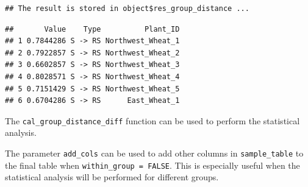 \documentclass[
]{book}
\newenvironment{Shaded}{\begin{snugshade}}{\end{snugshade}}
\newcommand{\AttributeTok}[1]{\textcolor[rgb]{0.13,0.29,0.53}{#1}}
\newcommand{\CommentTok}[1]{\textcolor[rgb]{0.56,0.35,0.01}{\textit{#1}}}
\newcommand{\FunctionTok}[1]{\textcolor[rgb]{0.13,0.29,0.53}{\textbf{#1}}}
\newcommand{\NormalTok}[1]{#1}
\newcommand{\SpecialCharTok}[1]{\textcolor[rgb]{0.81,0.36,0.00}{\textbf{#1}}}
\newcommand{\StringTok}[1]{\textcolor[rgb]{0.31,0.60,0.02}{#1}}
\begin{document}
\begin{verbatim}
## The result is stored in object$res_group_distance ...
\end{verbatim}

\begin{Shaded}
\end{Shaded}

\begin{verbatim}
##       Value    Type          Plant_ID
## 1 0.7844286 S -> RS Northwest_Wheat_1
## 2 0.7922857 S -> RS Northwest_Wheat_2
## 3 0.6602857 S -> RS Northwest_Wheat_3
## 4 0.8028571 S -> RS Northwest_Wheat_4
## 5 0.7151429 S -> RS Northwest_Wheat_5
## 6 0.6704286 S -> RS      East_Wheat_1
\end{verbatim}

The \texttt{cal\_group\_distance\_diff} function can be used to perform the statistical analysis.

\begin{Shaded}
\end{Shaded}

The parameter \texttt{add\_cols} can be used to add other columns in \texttt{sample\_table} to the final table when \texttt{within\_group\ =\ FALSE}.
This is especially useful when the statistical analysis will be performed for different groups.
\end{document}

